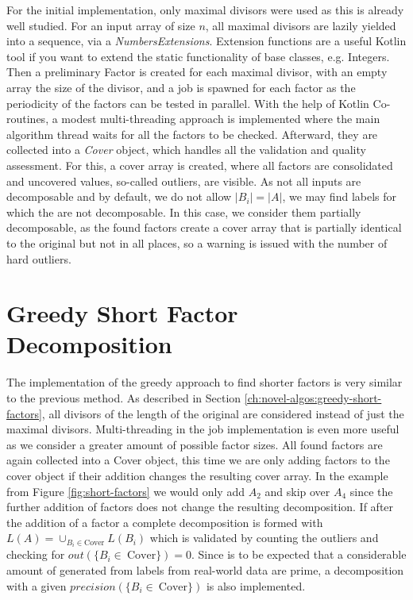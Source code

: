 For the initial implementation, only maximal divisors were used as this is already well studied.
For an input array of size $n$, all maximal divisors are lazily yielded into a sequence, via a \textit{NumbersExtensions}.
Extension functions are a useful Kotlin tool if you want to extend the static functionality of base classes, e.g. Integers.
Then a preliminary Factor is created for each maximal divisor, with an empty array the size of the divisor, and a job is spawned for each factor as the periodicity of the factors can be tested in parallel.
With the help of Kotlin Co-routines, a modest multi-threading approach is implemented where the main algorithm thread waits for all the factors to be checked. Afterward, they are collected into a \textit{Cover} object, which handles all the validation and quality assessment.
For this, a cover array is created, where all factors are consolidated and uncovered values, so-called outliers, are visible.
As not all inputs are decomposable and by default, we do not allow  $|B_i| = |A|$, we may find labels for which the \DFAs are not decomposable. In this case, we consider them partially decomposable, as the found factors create a cover array that is partially identical to the original but not in all places, so a warning is issued with the number of hard outliers.

\section{Greedy Short Factor Decomposition}
\label{ch:Implementation:greedy-short-factor}
The implementation of the greedy approach to find shorter factors is very similar to the previous method.
As described in Section \ref{ch:novel-algos:greedy-short-factors}, all divisors of the length of the original \DFA are considered instead of just the maximal divisors.
Multi-threading in the job implementation is even more useful as we consider a greater amount of possible factor sizes.
All found factors are again collected into a Cover object, this time we are only adding factors to the cover object if their addition changes the resulting cover array.
In the example from Figure \ref{fig:short-factors} we would only add $A_2$ and skip over $A_4$ since the further addition of factors does not change the resulting decomposition.
If after the addition of a factor a complete decomposition is formed with $L(A) = \cup_{B_i \in \text{Cover}} L(B_i)$ which is validated by counting the outliers and checking for $out(\{B_i \in~\text{Cover}\}) = 0$.
Since is to be expected that a considerable amount of \DFAs generated from labels from real-world data are prime, a decomposition with a given $precision(\{B_i \in~\text{Cover}\})$ is also implemented.

